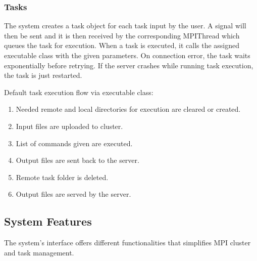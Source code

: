 \documentclass[journal]{./IEEE/IEEEtran}
\begin{document}
		\subsubsection{Tasks} 
		The system creates a task object for each task input by the user. A signal will then be sent and it is then received by the corresponding MPIThread which queues the task for execution. When a task is executed, it calls the assigned executable class with the given parameters. On connection error, the task waits exponentially before retrying. If the server crashes while running task execution, the task is just restarted.				
		
		 Default task execution flow via executable class:			
		\begin{enumerate}
			\item  Needed remote and local directories for execution are cleared or created.
			\item  Input files are uploaded to cluster.
			\item  List of commands given are executed.
			\item  Output files are sent back to the server.
			\item  Remote task folder is deleted.
			\item  Output files are served by the server.
		\end{enumerate}	

	\subsection{System Features}
	The system's interface offers different functionalities that simplifies MPI cluster and task management.
		
\end{document}
